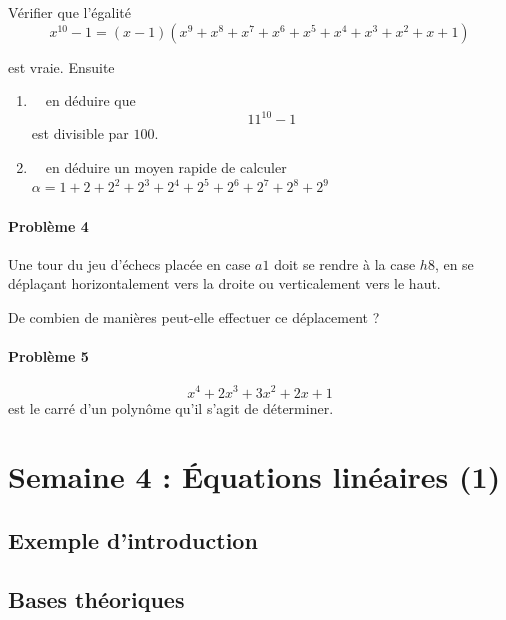 \documentclass[
  12pt,
]{book}
\providecommand{\tightlist}{%
  \setlength{\itemsep}{0pt}\setlength{\parskip}{0pt}}
\begin{document}
Vérifier que l'égalité
\[x^{10}-1=(x-1)(x^9 + x^8 + x^7 + x^6 + x^5 + x^4 + x^3 + x^2 + x + 1)\]

est vraie. Ensuite

\begin{enumerate}
\def\labelenumi{\alph{enumi}.}
\tightlist
\item
  \(\quad\)en déduire que \[11^{10}-1\] est divisible par \(100\).
\item
  \(\quad\)en déduire un moyen rapide de calculer \(\alpha = 1 + 2 + 2^2 + 2^3 + 2^4 + 2^5 + 2^6 + 2^7 + 2^8 + 2^9\)
\end{enumerate}

\hypertarget{probluxe8me-4-2}{%
\subsubsection*{Problème 4}\label{probluxe8me-4-2}}

Une tour du jeu d'échecs placée en case \(a1\) doit se rendre à la case \(h8\), en se déplaçant horizontalement vers la droite ou verticalement vers le haut.

De combien de manières peut-elle effectuer ce déplacement ?

\hypertarget{probluxe8me-5-1}{%
\subsubsection*{Problème 5}\label{probluxe8me-5-1}}

\[x^4+2x^3+3x^2+2x+1\] est le carré d'un polynôme qu'il s'agit de déterminer.

\hypertarget{semaine-4-uxe9quations-linuxe9aires-1}{%
\chapter{Semaine 4 : Équations linéaires (1)}\label{semaine-4-uxe9quations-linuxe9aires-1}}

\hypertarget{exemple-dintroduction-3}{%
\section{Exemple d'introduction}\label{exemple-dintroduction-3}}

\hypertarget{bases-thuxe9oriques-3}{%
\section{Bases théoriques}\label{bases-thuxe9oriques-3}}
\end{document}
